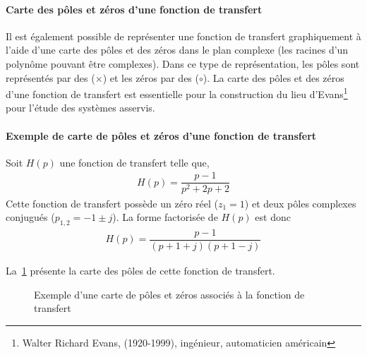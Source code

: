 \paragraph{Carte des pôles et zéros d'une fonction de transfert}

Il est également possible de représenter une fonction de transfert graphiquement à 
l'aide d'une carte des pôles et des zéros dans le plan complexe (les racines d'un polynôme 
pouvant être complexes). Dans ce type de représentation, les pôles 
sont représentés par des ($\times$) et les zéros par des ($\circ$).
La carte des pôles et des zéros d'une fonction de transfert est essentielle 
pour la construction du lieu d'Evans\footnote{Walter Richard Evans, (1920-1999), 
ingénieur, automaticien américain} pour l'étude des systèmes asservis.

\paragraph{Exemple de carte de pôles et zéros d'une fonction de transfert}

Soit $H(p)$ une fonction de transfert telle que,
\begin{align}
H(p)=\dfrac{p-1}{p^2+2p+2}\label{eq-ft_carte}
\end{align}
Cette fonction de transfert possède un zéro réel ($z_1=1$) et deux 
pôles complexes conjugués ($p_{1,2}=-1\pm j$).
La forme factorisée de $H(p)$ est donc
\begin{align} 
    H(p)=\dfrac{p-1}{(p+1+j)(p+1-j)}
\end{align}

La~\cref{fig-carte} présente la carte des pôles de cette fonction de transfert.
\begin{figure}[!h]
    \begin{center}
    
\end{center}
\caption{Exemple d'une carte de pôles et zéros associés 
    à la fonction de transfert~\label{fig-carte} }
\end{figure}





%

